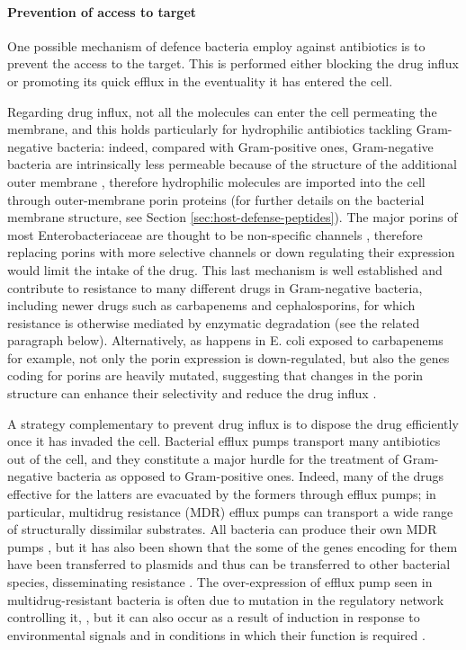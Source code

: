 \paragraph{Prevention of access to target}
One possible mechanism of defence bacteria employ against antibiotics is to prevent the access to the target. This is performed either blocking the drug influx or promoting its quick efflux in the eventuality it has entered the cell.

Regarding drug influx, not all the molecules can enter the cell permeating the membrane, and this holds particularly for hydrophilic antibiotics tackling Gram-negative bacteria: indeed, compared with Gram-positive ones, Gram-negative bacteria are intrinsically less permeable because of the structure of the additional outer membrane \cite{Delcour2009}, therefore hydrophilic molecules are imported into the cell through outer-membrane porin proteins \cite{Vargiu2012,Kojima2013} (for further details on the bacterial membrane structure, see Section \ref{sec:host-defense-peptides}).
%
The major porins of most Enterobacteriaceae are thought to be non-specific channels \cite{Tran2013}, therefore replacing porins with more selective channels or down regulating their expression would limit the intake of the drug. This last mechanism is well established and contribute to resistance to many different drugs in Gram-negative bacteria, including newer drugs such as carbapenems and cephalosporins, for which resistance is otherwise mediated by enzymatic degradation \cite{Tamber2003,Baroud2013,Lavigne2013,Poulou2013,Wozniak2012} (see the related paragraph below).
Alternatively, as happens in E. coli exposed to carbapenems for example, not only the porin expression is down-regulated, but also the genes coding for porins are heavily mutated, suggesting that changes in the porin structure can enhance their selectivity and reduce the drug influx \cite{Lavigne2013,Novais2012,Tangden2013}.

A strategy complementary to prevent drug influx is to dispose the drug efficiently once it has invaded the cell. Bacterial efflux pumps transport many antibiotics out of the cell, and they constitute a major hurdle for the treatment of Gram-negative bacteria as opposed to Gram-positive ones. Indeed, many of the drugs effective for the latters are evacuated by the formers through efflux pumps; in particular, multidrug resistance (MDR) efflux pumps can transport a wide range of structurally dissimilar substrates.
%
All bacteria can produce their own MDR pumps \cite{Floyd2010,Hu2012,Kim2013,Ogawa2012}, but it has also been shown that the some of the genes encoding for them have been transferred to plasmids and thus can be transferred to other bacterial species, disseminating resistance \cite{Dolejska2013}.
%
The over-expression of efflux pump seen in multidrug-resistant bacteria is often due to mutation in the regulatory network controlling it, \cite{Abouzeed2008}, but it can also occur as a result of induction in response to environmental signals and in conditions in which their function is required \cite{Baucheron2014,Nikaido2011,Hirakawa2004}.


